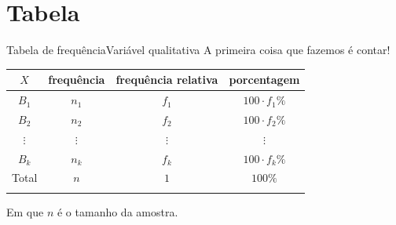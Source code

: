 \documentclass[
  10pt,
  ignorenonframetext,
]{beamer}
\begin{document}
\hypertarget{tabela}{%
\section{Tabela}\label{tabela}}

\begin{frame}{Tabela de frequência\newline Variável qualitativa}
\protect\hypertarget{tabela-de-frequuxeanciavariuxe1vel-qualitativa}{}
A primeira coisa que fazemos é contar!

\begin{longtable}[]{@{}cccc@{}}
\toprule\noalign{}
\(X\) & frequência & frequência relativa & porcentagem \\
\midrule\noalign{}
\endhead
\(B_1\) & \(n_1\) & \(f_1\) & \(100 \cdot f_1\%\) \\
\(B_2\) & \(n_2\) & \(f_2\) & \(100 \cdot f_2\%\) \\
\(\vdots\) & \(\vdots\) & \(\vdots\) & \(\vdots\) \\
\(B_k\) & \(n_k\) & \(f_k\) & \(100 \cdot f_k\%\) \\
Total & \(n\) & \(1\) & \(100\%\) \\
\bottomrule\noalign{}
\end{longtable}

Em que \(n\) é o tamanho da amostra.
\end{frame}
\end{document}
